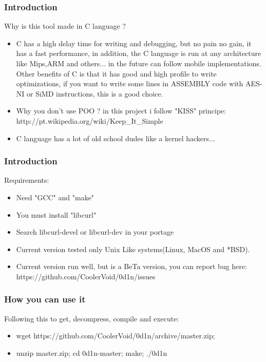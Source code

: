 \documentclass[serif,mathserif]{beamer}
\begin{document}
\begin{frame}
  \frametitle{Introduction}
  Why is this tool made in C language ?
  \begin{itemize}
  \item  C has a high delay time for writing and debugging, but no pain no gain, it has a fast performance, in addition, the C language is run at any architecture like Mips,ARM and others... in the future can follow mobile implementations. Other benefits of C  is that it has good and high profile to write optimizations, if you want to write some lines in ASSEMBLY code with AES-NI or SiMD instructions, this is a good choice. 
  \item  Why you don't use POO ? in this project i follow "KISS" principe: http://pt.wikipedia.org/wiki/Keep\_It\_Simple
  \item  C language has a lot of old school dudes like a kernel hackers... 
  \end{itemize}
\end{frame}



\begin{frame}
  \frametitle{Introduction}
  Requirements:
  \begin{itemize}
  \item  Need "GCC" and "make" 
  \item  You must install "libcurl" 
  \item  Search libcurl-devel or libcurl-dev in your portage
  \item  Current version tested only Unix Like systems(Linux, MacOS and *BSD).
  \item  Current version run well, but is a BeTa version, you can report bug here: https://github.com/CoolerVoid/0d1n/issues 
  \end{itemize}
\end{frame}


\begin{frame}
  \frametitle{How you can use it}
  Following this to get, decompress, compile and execute:
  \begin{itemize}
  \item wget https://github.com/CoolerVoid/0d1n/archive/master.zip; 
  \item unzip master.zip; cd 0d1n-master; make; ./0d1n
  \end{itemize}
\end{frame}
\end{document}
